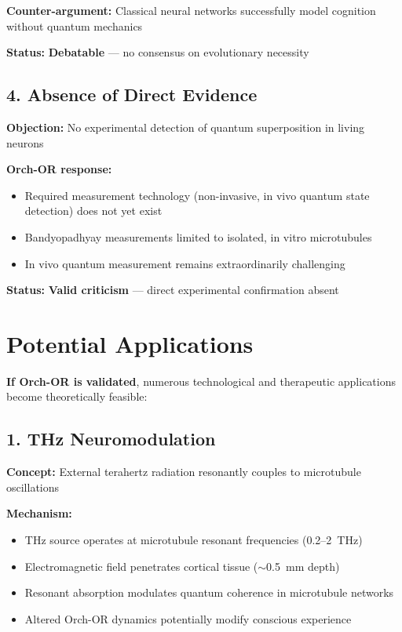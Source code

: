 \textbf{Counter-argument:} Classical neural networks successfully model cognition without quantum mechanics

\textbf{Status:} \textbf{Debatable} --- no consensus on evolutionary necessity

\subsection{4. Absence of Direct Evidence}

\textbf{Objection:} No experimental detection of quantum superposition in living neurons

\textbf{Orch-OR response:}
\begin{itemize}
\item Required measurement technology (non-invasive, in vivo quantum state detection) does not yet exist
\item Bandyopadhyay measurements limited to isolated, in vitro microtubules
\item In vivo quantum measurement remains extraordinarily challenging
\end{itemize}

\textbf{Status:} \textbf{Valid criticism} --- direct experimental confirmation absent

\section{Potential Applications}

\textbf{If Orch-OR is validated}, numerous technological and therapeutic applications become theoretically feasible:

\subsection{1. THz Neuromodulation}

\textbf{Concept:} External terahertz radiation resonantly couples to microtubule oscillations

\textbf{Mechanism:}
\begin{itemize}
\item THz source operates at microtubule resonant frequencies (0.2--2~THz)
\item Electromagnetic field penetrates cortical tissue ($\sim$0.5~mm depth)
\item Resonant absorption modulates quantum coherence in microtubule networks
\item Altered Orch-OR dynamics potentially modify conscious experience
\end{itemize}

